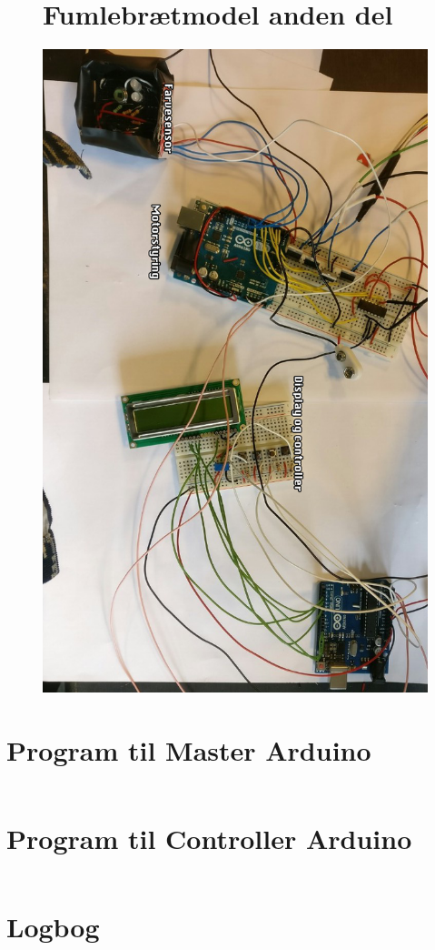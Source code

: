 \begin{figure}[H]
\section{Fumlebrætmodel anden del}
	\centering
    \includegraphics[width=13cm]{figures/2_5fremstilling/prototyper/rumleKreds.png}
\end{figure}


\section{Program til Master Arduino}
\label{bilag:program}
\begin{lstlisting}

\end{lstlisting}

\section{Program til Controller Arduino}
\label{bilag:program}
\begin{lstlisting}

\end{lstlisting}

\section{Logbog} 